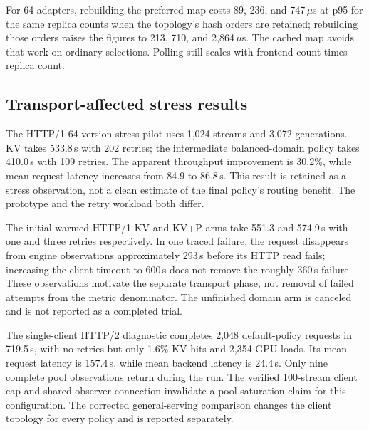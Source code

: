 For 64 adapters, rebuilding the preferred map costs 89, 236, and
747\,$\mu$s at p95 for the same replica counts when the topology's hash orders
are retained; rebuilding those orders raises the figures to 213, 710, and
2,864\,$\mu$s. The cached map avoids that work on ordinary selections. Polling
still scales with frontend count times replica count.

\subsection{Transport-affected stress results}
The HTTP/1 64-version stress pilot uses 1,024 streams and 3,072 generations.
KV takes 533.8\,s with 202 retries; the intermediate balanced-domain policy
takes 410.0\,s with 109 retries. The apparent throughput improvement is 30.2\%,
while mean request latency increases from 84.9 to 86.8\,s. This result is
retained as a stress observation, not a clean estimate of the final policy's
routing benefit. The prototype and the retry workload both differ.

The initial warmed HTTP/1 KV and KV+P arms take 551.3 and 574.9\,s with one
and three retries respectively. In one traced failure, the request disappears
from engine observations approximately 293\,s before its HTTP read fails;
increasing the client timeout to 600\,s does not remove the roughly 360\,s
failure. These observations motivate the separate transport phase, not removal
of failed attempts from the metric denominator. The unfinished domain arm is
canceled and is not reported as a completed trial.

The single-client HTTP/2 diagnostic completes 2,048 default-policy requests in
719.5\,s, with no retries but only 1.6\% KV hits and 2,354 GPU loads. Its mean
request latency is 157.4\,s, while mean backend latency is 24.4\,s. Only nine
complete pool observations return during the run. The verified 100-stream
client cap and shared observer connection invalidate a pool-saturation claim
for this configuration. The corrected general-serving comparison changes the
client topology for every policy and is reported separately.
